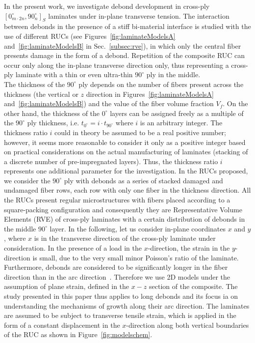 \documentclass[review]{elsarticle}
\begin{document}
In the present work, we investigate debond development in cross-ply $\left[0_{m\cdot2n}^{\circ},90_{n}^{\circ}\right]_{S}$ laminates under in-plane transverse tension. The interaction between debonds in the presence of a stiff bi-material interface is studied with the use of different RUCs (see Figures~\ref{fig:laminateModelsA} and~\ref{fig:laminateModelsB} in Sec.~\ref{subsec:rve}), in which only the central fiber presents damage in the form of a debond. Repetition of the composite RUC can occur only along the in-plane transverse direction only, thus representing a cross-ply laminate with a thin or even ultra-thin $90^{\circ}$ ply in the middle.\\
The thickness of the $90^{\circ}$ ply depends on the number of fibers present across the thickness (the vertical or $z$ direction in Figures~\ref{fig:laminateModelsA} and~\ref{fig:laminateModelsB}) and the value of the fiber volume fraction $V_{f}$. On the other hand, the thickness of the $0^{\circ}$ layers can be assigned freely as a multiple of the $90^{\circ}$ ply thickness, i.e. $t_{0^{\circ}}=i\cdot t_{90^{\circ}}$ where $i$ is an arbitrary integer. The thickness ratio $i$ could in theory be assumed to be a real positive number; however, it seems more reasonable to consider it only as a positive integer based on practical considerations on the actual manufacturing  of laminates (stacking of a discrete number of pre-impregnated layers). Thus, the thickness ratio $i$ represents one additional parameter for the investigation. In the RUCs proposed, we consider the $90^{\circ}$ ply with debonds as a series of stacked damaged and undamaged fiber rows, each row with only one fiber in the thickness direction. All the RUCs present regular microstructures with fibers placed according to a square-packing configuration and consequently they are Representative Volume Elements (RVE) of cross-ply laminates with a certain distribution of debonds in the middle $90^{\circ}$ layer. In the following, let us consider in-plane coordinates $x$ and $y$, where $x$ is in the transverse direction of the cross-ply laminate under consideration. In the presence of a load in the $x$-direction, the strain in the $y$-direction is small, due to the very small minor Poisson's ratio of the laminate. Furthermore, debonds are considered to be significantly longer in the fiber direction than in the arc direction~\cite{Zhang1997}. Therefore we use 2D models under the assumption of plane strain, defined in the $x-z$ section of the composite. The study presented in this paper thus applies to long debonds and its focus ia on understanding the mechanisms of growth along their arc direction. The laminates are assumed to be subject to transverse tensile strain, which is applied in the form of a constant displacement in the $x$-direction along both vertical boundaries of the RUC as shown in  Figure~\ref{fig:modelschem}.\\
\end{document}
